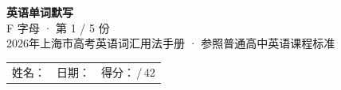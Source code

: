 \documentclass[10pt,a4paper]{article}
\begin{document}
\pagestyle{plain}

\begin{center}
{\LARGE\bfseries 英语单词默写}\\[0.22em]
{\large F 字母 · 第 1 / 5 份}\\[0.18em]
{\small 2026年上海市高考英语词汇用法手册 · 参照普通高中英语课程标准}
\end{center}

\vspace{0.25em}
\noindent\begin{tabular}{@{}p{}@{}p{}@{}p{}@{}}
姓名：\underline{\hspace{2.0cm}} & 日期：\underline{\hspace{2.0cm}} & 得分：\underline{\hspace{1.3cm}}\,/\,42 \\
\end{tabular}

\vspace{0.3em}

\vspace{0.08em}
\end{document}
